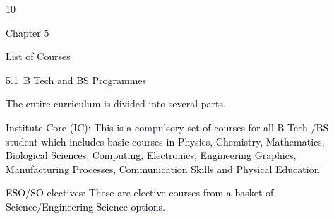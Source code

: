 \documentclass[12pt]{article}
\begin{document}
\vspace{\baselineskip}

\vspace{\baselineskip}

\vspace{\baselineskip}

\vspace{\baselineskip}

\vspace{\baselineskip}
\begin{Center}
\textcolor[HTML]{00000A}{10}
\end{Center}\par


\vspace{\baselineskip}
{\fontsize{14pt}{16.8pt}\selectfont \textcolor[HTML]{00000A}{Chapter 5}\par}\par


\vspace{\baselineskip}
{\fontsize{20pt}{24.0pt}\selectfont \textcolor[HTML]{00000A}{List of Courses}\par}\par


\vspace{\baselineskip}
\textcolor[HTML]{00000A}{5.1\  B Tech and BS Programmes}\par


\vspace{\baselineskip}
{\fontsize{10pt}{12.0pt}\selectfont \textcolor[HTML]{00000A}{The entire curriculum is divided into several parts.}\par}\par


\vspace{\baselineskip}
\begin{justify}
{\fontsize{10pt}{12.0pt}\selectfont \textcolor[HTML]{00000A}{Institute Core (IC): This is a compulsory set of courses for all B Tech /BS student which includes basic courses in Physics, Chemistry, Mathematics, Biological Sciences, Computing, Electronics, Engineering Graphics, Manufacturing Processes, Communication Skills and Physical Education}\par}
\end{justify}\par


\vspace{\baselineskip}
{\fontsize{10pt}{12.0pt}\selectfont \textcolor[HTML]{00000A}{ESO/SO electives: These are elective courses from a basket of Science/Engineering-Science options.}\par}\par
\end{document}
